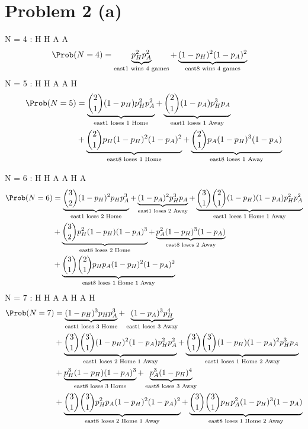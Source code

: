\documentclass[12pt]{report}
\begin{document}
\section*{Problem 2 (a)}
    N = 4 : H H A A 
\begin{align*}
    \Prob(N=4) 
    &= 
    \underbrace{p_H^2 p_A^2}_{\text{east1 wins 4 games}} +
    \underbrace{(1-p_H)^2 (1-p_A)^2}_{\text{east8 wins 4 games}} 
\end{align*}
    N = 5 : H H A A H 
\begin{align*}
    \Prob(N=5) 
    &= 
    \underbrace{\binom{2}{1}(1-p_H) p_H^2 p_A^2}_{\text{east1 loses 1 Home}} + 
    \underbrace{\binom{2}{1}(1-p_A) p_H^3 p_A}_{\text{east1
    loses 1 Away}} \\ 
    &+ 
    \underbrace{\binom{2}{1}p_H(1-p_H)^2(1-p_A)^2}_{\text{east8 loses 1 Home}} +
    \underbrace{\binom{2}{1}p_A (1-p_H)^3 (1-p_A)}_{\text{east8 loses 1 Away}}
\end{align*}

    N = 6 : H H A A H A 
\begin{align*}
    \Prob(N=6) 
    &= 
    \underbrace{\binom{3}{2}(1-p_H)^2 p_H p_A^3}_{\text{east1 loses 2 Home}} + 
    \underbrace{(1-p_A)^2 p_H^3 p_A}_{\text{east1 loses 2 Away}}+
    \underbrace{\binom{3}{1}\binom{2}{1} (1-p_H)(1-p_A) p_H^2
        p_A^2}_{\text{east1 loses 1 Home 1 Away}} \\ 
    &+ 
    \underbrace{\binom{3}{2}p_H^2 (1-p_H)(1- p_A)^3}_{\text{east8 loses 2 Home}}
    +
    \underbrace{p_A^2 (1-p_H)^3 (1-p_A)}_{\text{east8 loses 2
            Away}} \\
    &+
    \underbrace{\binom{3}{1}\binom{2}{1} p_H p_A (1-p_H)^2
            (1-p_A)^2}_{\text{east8 loses 1 Home 1 Away}} 
\end{align*}
    N = 7 : H H A A H A H 
\begin{align*}
    \Prob(N=7) 
    &= 
    \underbrace{(1-p_H)^3 p_H p_A^3}_{\text{east1 loses 3
    Home}} + 
    \underbrace{(1-p_A)^3p_H^4}_{\text{east1 loses 3 Away}}\\
    &+ 
    \underbrace{\binom{3}{1}\binom{3}{1} (1- p_H)^2(1-p_A)
        p_H^2 p_A^2}_{\text{east1 loses 2 Home 1 Away}} +
        \underbrace{\binom{3}{1}\binom{3}{1}(1-p_H)(1-p_A)^2 p_H^3
        p_A}_{\text{east1 loses 1 Home 2 Away}} \\
    &+
    \underbrace{p_H^3 (1-p_H)(1- p_A)^3}_{\text{east8 loses 3
    Home}} + 
    \underbrace{p_A^3(1-p_H)^4}_{\text{east8 loses 3 Away}}\\
    &+ 
    \underbrace{\binom{3}{1}\binom{3}{1} p_H^2 p_A
    (1-p_H)^2 (1-p_A)^2}_{\text{east8 loses 2 Home 1 Away}} +
    \underbrace{\binom{3}{1}\binom{3}{1}p_H p_A^2 (1-p_H)^3
    (1-p_A)}_{\text{east8 loses 1 Home 2 Away}} \\
\end{align*}
\end{document}
